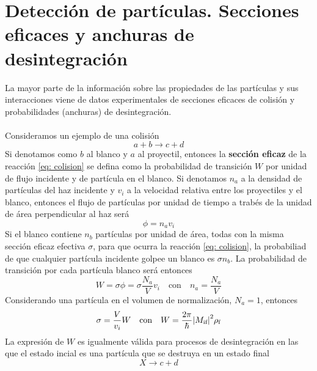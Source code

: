 \pagestyle{fancy}
\chapter{Detección de partículas. Secciones eficaces y anchuras de desintegración}
\label{chap: Apendice B}
La mayor parte de la información sobre las propiedades de las partículas y sus interacciones viene de datos experimentales de secciones eficaces de colisión y probabilidades (anchuras) de desintegración.\\\\
Consideramos un ejemplo de una colisión
\begin{equation}
    a+b \longrightarrow c+d
    \label{eq: colision}
\end{equation}
Si denotamos como $b$ al blanco y $a$ al proyectil, entonces la \textbf{sección eficaz} de la reacción \ref{eq: colision} se defina como la probabilidad de transición $W$ por unidad de flujo incidente y de partícula en el blanco. Si denotamos $n_a$ a la densidad de partículas del haz incidente y $v_i$ a la velocidad relativa entre los proyectiles y el blanco, entonces el flujo de partículas por unidad de tiempo a trabés de la unidad de área perpendicular al haz será
\begin{equation}
    \phi=n_a v_i
\end{equation}
Si el blanco contiene $n_b$ partículas por unidad de área, todas con la misma sección eficaz efectiva $\sigma$, para que ocurra la reacción \ref{eq: colision}, la probabiliad de que cualquier partícula incidente golpee un blanco es $\sigma n_b$. La probabilidad de transición por cada partícula blanco será entonces
\begin{equation}
    W=\sigma \phi=\sigma \frac{N_a}{V} v_i \quad \text{con} \quad n_a=\frac{N_a}{V}
    \label{eq: Probabilidad de transicion para cada particula blanco}
\end{equation}
Considerando una partícula en el volumen de normalización, $N_a=1$, entonces 
\begin{equation}
    \sigma=\frac{V}{v_i}W \quad \text{con} \quad W=\frac{2\pi}{\hbar} \abs{M_\text{if}}^2\rho_\text{f}
    \label{eq: seccion eficaz}
\end{equation}
La expresión de $W$ es igualmente válida para procesos de desintegración en las que el estado incial es una partícula que se destruya en un estado final
\begin{equation}
    X\longrightarrow c+d
    \label{eq: desintegracion}
\end{equation}
